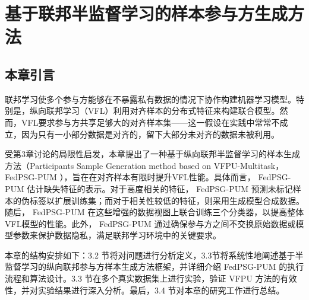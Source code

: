 \chapter{基于联邦半监督学习的样本参与方生成方法}
\thispagestyle{others}
\pagestyle{others}
\xiaosi

\section{本章引言}
联邦学习使多个参与方能够在不暴露私有数据的情况下协作构建机器学习模型。特别是，纵向联邦学习（VFL）利用对齐样本的分布式特征来构建联合模型。然而，VFL要求参与方共享足够大的对齐样本集——这一假设在实践中常常不成立，因为只有一小部分数据是对齐的，留下大部分未对齐的数据未被利用。

受第3章讨论的局限性启发，本章提出了一种基于纵向联邦半监督学习的样本生成方法（Participants Sample Generation method based on VFPU-Multitask， FedPSG-PUM ），旨在在对齐样本有限时提升VFL性能。具体而言， FedPSG-PUM 估计缺失特征的表示。对于高度相关的特征， FedPSG-PUM 预测未标记样本的伪标签以扩展训练集；而对于相关性较低的特征，则采用生成模型合成数据。随后， FedPSG-PUM 在这些增强的数据视图上联合训练三个分类器，以提高整体VFL模型的性能。此外， FedPSG-PUM 通过确保参与方之间不交换原始数据或模型参数来保护数据隐私，满足联邦学习环境中的关键要求。

本章的结构安排如下：3.2 节将对问题进行分析定义，3.3节将系统性地阐述基于半监督学习的纵向联邦参与方样本生成方法框架，并详细介绍  FedPSG-PUM  的执行流程和算法设计。3.3 节在多个真实数据集上进行实验，验证 VFPU 方法的有效性，并对实验结果进行深入分析。最后，3.4 节对本章的研究工作进行总结。

